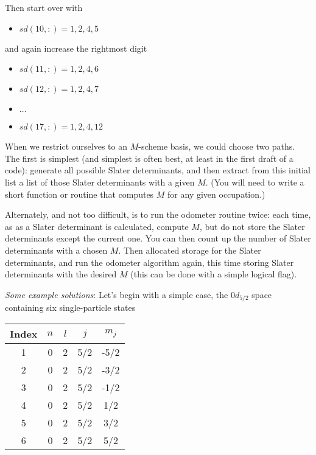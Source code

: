 \documentclass[graybox,sectrefs,envcountresetchap,open=right]{svmonodo}
\begin{document}
\noindent
Then start over with 
\begin{itemize}
\item $sd(10,:)= 1,2,4,5$
\end{itemize}

\noindent
and again increase the rightmost digit

\begin{itemize}
\item $sd(11,:)= 1,2,4,6$

\item $sd(12,:)= 1,2,4,7$

\item $\ldots$

\item $sd(17,:)= 1,2,4,12$
\end{itemize}

\noindent
When we restrict ourselves to an $M$-scheme basis, we could choose two paths. 
The first is simplest (and simplest is often best, at 
least in the first draft of a code): generate all possible Slater determinants, 
and then extract from this initial list a list of those Slater determinants with a given 
$M$. (You will need to write a short function or routine that computes $M$ for any 
given occupation.)  


Alternately, and not too difficult, is to run the odometer routine twice: each time, as 
as a Slater determinant is calculated, compute $M$, but do not store the Slater determinants 
except the current one. You can then count up the number of Slater determinants with a 
chosen $M$.  Then allocated storage for the Slater determinants, and run the odometer 
algorithm again, this time storing Slater determinants with the desired $M$ (this can be 
done with a simple logical flag). 



\emph{Some example solutions}:  Let's begin with a simple case, the $0d_{5/2}$ space containing six single-particle states



{\small   %

\vspace{4mm}

\begin{tabular}{ccccc}
\hline
\multicolumn{1}{c}{ Index } & \multicolumn{1}{c}{ $n$ } & \multicolumn{1}{c}{ $l$ } & \multicolumn{1}{c}{ $j$ } & \multicolumn{1}{c}{ $m_j$ } \\
\hline
1     & 0   & 2   & 5/2 & -5/2  \\
2     & 0   & 2   & 5/2 & -3/2  \\
3     & 0   & 2   & 5/2 & -1/2  \\
4     & 0   & 2   & 5/2 & 1/2   \\
5     & 0   & 2   & 5/2 & 3/2   \\
6     & 0   & 2   & 5/2 & 5/2   \\
\hline
\end{tabular}

\vspace{4mm}

}
\end{document}
